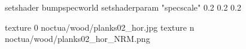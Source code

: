 setshader bumpspecworld
setshaderparam "specscale" 0.2 0.2 0.2

texture 0 noctua/wood/planks02_hor.jpg
texture n noctua/wood/planks02_hor_NRM.png
